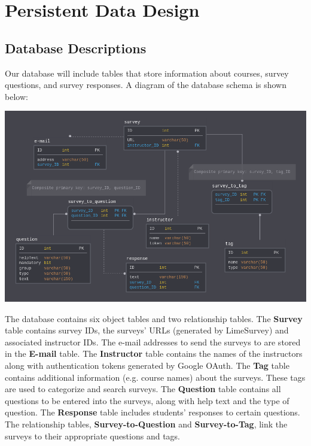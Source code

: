 \documentclass{article}
\begin{document}
\newpage

\section{Persistent Data Design}
\subsection{Database Descriptions}

Our database will include tables that store information about courses, survey questions, and survey responses. A diagram of the database schema is shown below:

\begin{center}
\label{fig:schemadiagram}
{\includegraphics[scale=.5]{images/schema_diagram.png}} 
\end{center}

The database contains six object tables and two relationship tables. The \textbf{Survey} table contains survey IDs, the surveys' URLs (generated by LimeSurvey) and associated instructor IDs. The e-mail addresses to send the surveys to are stored in the \textbf{E-mail} table. The \textbf{Instructor} table contains the names of the instructors along with authentication tokens generated by Google OAuth. The \textbf{Tag} table contains additional information (e.g. course names) about the surveys. These tags are used to categorize and search surveys. The \textbf{Question} table contains all questions to be entered into the surveys, along with help text and the type of question. The \textbf{Response} table includes students' responses to certain questions. The relationship tables, \textbf{Survey-to-Question} and \textbf{Survey-to-Tag}, link the surveys to their appropriate questions and tags.
\end{document}
